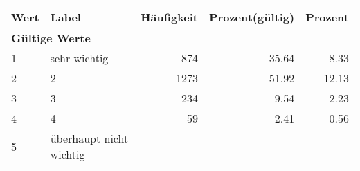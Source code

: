      \begin{longtable}{lXrrr}
     \toprule
     \textbf{Wert} & \textbf{Label} & \textbf{Häufigkeit} & \textbf{Prozent(gültig)} & \textbf{Prozent} \\
     \endhead
     \midrule
     \multicolumn{5}{l}{\textbf{Gültige Werte}}\\

     1 &
     \multicolumn{1}{X}{ sehr wichtig   } &


       \num{874} &
       \num[round-mode=places,round-precision=2]{35,64} &
         \num[round-mode=places,round-precision=2]{8,33} \\

     2 &
     \multicolumn{1}{X}{ 2   } &


       \num{1273} &
       \num[round-mode=places,round-precision=2]{51,92} &
         \num[round-mode=places,round-precision=2]{12,13} \\

     3 &
     \multicolumn{1}{X}{ 3   } &


       \num{234} &
       \num[round-mode=places,round-precision=2]{9,54} &
         \num[round-mode=places,round-precision=2]{2,23} \\

     4 &
     \multicolumn{1}{X}{ 4   } &


       \num{59} &
       \num[round-mode=places,round-precision=2]{2,41} &
         \num[round-mode=places,round-precision=2]{0,56} \\

     5 &
     \multicolumn{1}{X}{ überhaupt nicht wichtig   } &



\end{longtable}
